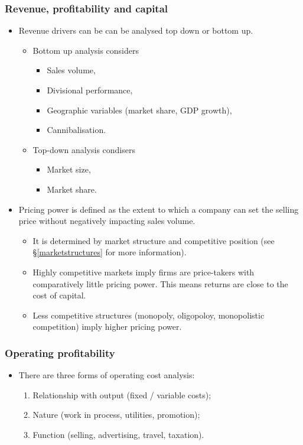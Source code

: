 \documentclass[../notes_compiled.tex]{subfiles}
\begin{document}
\subsubsection{Revenue, profitability and capital}
\begin{itemize}
\item Revenue drivers can be can be analysed top down or bottom up.
\begin{itemize}
\item Bottom up analysis considers
\begin{itemize}
\item Sales volume,
\item Divisional performance,
\item Geographic variables (market share, GDP growth),
\item Cannibalisation.
\end{itemize}
\item Top-down analysis condisers
\begin{itemize}
\item Market size,
\item Market share.
\end{itemize}
\end{itemize}
\item Pricing power is defined as the extent to which a company can set the selling price without negatively impacting sales volume.
\begin{itemize}
\item It is determined by market structure and competitive position (see \S\ref{marketstructures} for more information).
\item Highly competitive markets imply firms are price-takers with comparatively little pricing power. This means returns are close to the cost of capital.
\item Less competitive structures (monopoly, oligopoloy, monopolistic competition) imply higher pricing power.
\end{itemize}
\end{itemize}


\subsubsection{Operating profitability}
\begin{itemize}
\item There are three forms of operating cost analysis:
\begin{enumerate}
\item Relationship with output (fixed / variable costs);
\item Nature (work in process, utilities, promotion);
\item Function (selling, advertising, travel, taxation).
\end{enumerate}
\end{itemize}
\end{document}
